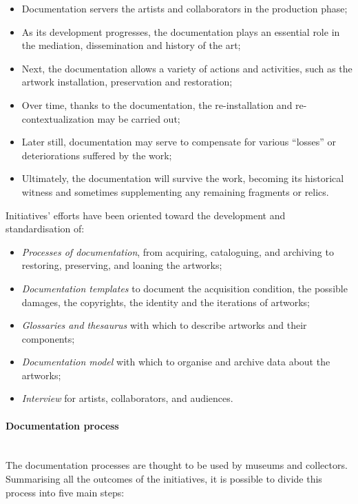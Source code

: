\begin{itemize}
    \item Documentation servers the artists and collaborators in the production phase;
    \item As its development progresses, the documentation plays an essential role in the mediation, dissemination and history of the art;
    \item Next, the documentation allows a variety of actions and activities, such as the artwork installation, preservation and restoration;
    \item Over time, thanks to the documentation, the re-installation and re-contextualization may be carried out;
    \item Later still, documentation may serve to compensate for various “losses” or deteriorations suffered by the work;
    \item Ultimately, the documentation will survive the work, becoming its historical witness and sometimes supplementing any remaining fragments or relics.
\end{itemize}

Initiatives’ efforts have been oriented toward the development and standardisation of:

\begin{itemize}
    \item \textit{Processes of documentation}, from acquiring, cataloguing, and archiving to restoring, preserving, and loaning the artworks; 
    \item \textit{Documentation templates} to document the acquisition condition, the possible damages, the copyrights, the identity and the iterations of artworks;
    \item \textit{Glossaries and thesaurus} with which to describe artworks and their components;
    \item \textit{Documentation model} with which to organise and archive data about the artworks;
    \item \textit{Interview} for artists, collaborators, and audiences.
\end{itemize}

\paragraph*{Documentation process}\\
The documentation processes are thought to be used by museums and collectors. Summarising all the outcomes of the initiatives, it is possible to divide this process into five main steps:

